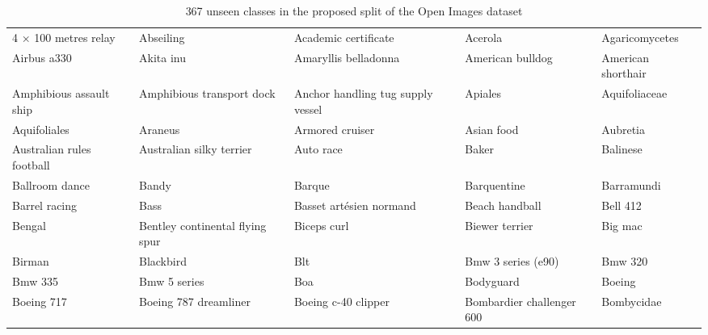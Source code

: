 \documentclass[10pt,journal,compsoc]{IEEEtran}
\begin{document}
\begin{table*}[!h]
\caption{367 unseen classes in the proposed split of the Open Images dataset\vspace{-0.1cm}}
\label{tab:openimages_unseen}
\centering
\tiny
\begin{tabular}{lllll}
\toprule
4 × 100 metres relay      & Abseiling                       & Academic certificate              & Acerola                                    & Agaricomycetes                     \\
Airbus a330               & Akita inu                       & Amaryllis belladonna              & American bulldog                           & American shorthair                 \\
Amphibious assault ship   & Amphibious transport dock       & Anchor handling tug supply vessel & Apiales                                    & Aquifoliaceae                      \\
Aquifoliales              & Araneus                         & Armored cruiser                   & Asian food                                 & Aubretia                           \\
Australian rules football & Australian silky terrier        & Auto race                         & Baker                                      & Balinese                           \\
Ballroom dance            & Bandy                           & Barque                            & Barquentine                                & Barramundi                         \\
Barrel racing             & Bass                            & Basset artésien normand           & Beach handball                             & Bell 412                           \\
Bengal                    & Bentley continental flying spur & Biceps curl                       & Biewer terrier                             & Big mac                            \\
Birman                    & Blackbird                       & Blt                               & Bmw 3 series (e90)                         & Bmw 320                            \\
Bmw 335                   & Bmw 5 series                    & Boa                               & Bodyguard                                  & Boeing                             \\
Boeing 717                & Boeing 787 dreamliner           & Boeing c-40 clipper               & Bombardier challenger 600                  & Bombycidae                         \\

\end{tabular}
\end{table*}
\end{document}
